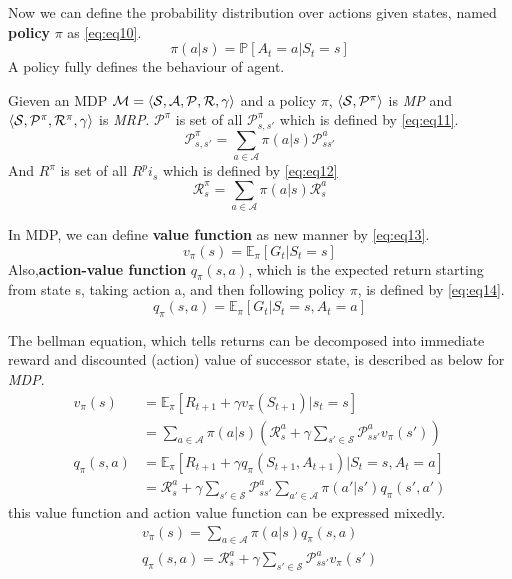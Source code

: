 \documentclass[
	10pt, %
]{article}
\def\n{\newline}
\newcommand{\mbb}[1]{\mathbb{#1}}
\newcommand{\mc}[1]{\mathcal{#1}}
\newcommand{\tb}[1]{\textbf{#1}}
\newcommand{\ti}[1]{\textit{#1}}
\begin{document}
Now we can define the probability distribution over actions given states, named \tb{policy} $\pi$ as \cref{eq:eq10}.
\begin{equation} \label{eq:eq10}
    \pi(a|s) = \mbb{P}[A_t=a|S_t=s]
\end{equation}
A policy fully defines the behaviour of agent.
\n

Gieven an MDP $\mc{M}=\braket{\mc{S, A, P, R}, \gamma}$ and a policy $\pi$, $\braket{\mc{S}, \mc{P}^\pi}$ is \ti{MP} and $\braket{\mc{S},\mc{P}^\pi, \mc{R}^\pi, \gamma}$ is \ti{MRP}. $\mc{P}^\pi$ is set of all $\mc{P}^\pi_{s,s'}$ which is defined by \cref{eq:eq11}.
\begin{equation} \label{eq:eq11}
    \mc{P}^\pi_{s,s'} = \sum_{a \in \mc{A}}\pi(a|s)\mc{P}^a_{ss'}
\end{equation}
And $R^\pi$ is set of all $R^pi_s$ which is defined by \cref{eq:eq12}
\begin{equation} \label{eq:eq12}
    \mc{R}^\pi_s = \sum_{a \in \mc{A}}\pi(a|s)\mc{R}^a_s
\end{equation}
\n

In MDP, we can define \tb{value function} as new manner by \cref{eq:eq13}.
\begin{equation} \label{eq:eq13}
    v_\pi(s) = \mbb{E}_\pi[G_t|S_t=s]
\end{equation}
Also,\tb{action-value function} $q_\pi(s,a)$, which is the expected return starting from state s, taking action a, and then following policy $\pi$, is defined by \cref{eq:eq14}.
\begin{equation} \label{eq:eq14}
    q_\pi(s,a) = \mbb{E}_\pi[G_t|S_t=s, A_t=a]
\end{equation}

The bellman equation, which tells returns can be decomposed into immediate reward and discounted (action) value of successor state, is described as below for \ti{MDP}.
\begin{equation} \label{eq:eq15}
\begin{aligned} 
    v_\pi(s)&=\mbb{E}_\pi[R_{t+1}+\gamma v_\pi(S_{t+1})|s_t=s]\\
    &=\sum_{a \in \mc{A}}\pi(a|s)\left(\mc{R}^a_{s}+\gamma\sum_{s' \in \mc{S}}\mc{P}^a_{ss'}v_\pi(s')\right)\\
    q_\pi(s,a)&=\mbb{E}_\pi[R_{t+1}+\gamma q_\pi(S_{t+1},A_{t+1})|S_t=s,A_t=a]\\
    &=\mc{R}^a_s+\gamma \sum_{s' \in \mc{S}}\mc{P}_{ss'}^a \sum_{a' \in \mc{A}} \pi(a'|s')q_\pi(s',a')
\end{aligned}
\end{equation}
this value function and action value function can be expressed mixedly.
\begin{equation} \label{eq:eq16}
    \begin{aligned}
        v_\pi(s) = \sum_{a \in \mc{A}}\pi(a|s)q_\pi(s,a)\\
        q_\pi(s,a) = \mc{R}^a_s + \gamma\sum_{s' \in \mc{S}}\mc{P}^a_{ss'}v_\pi(s')
    \end{aligned}
\end{equation}
\n
\end{document}
